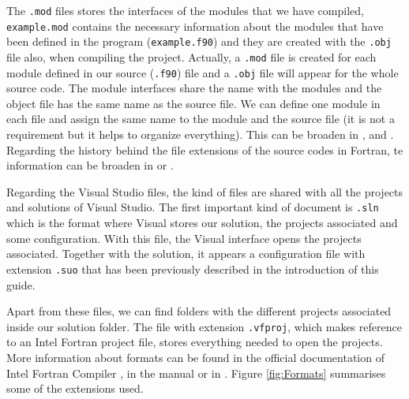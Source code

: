 \begin{enumerate}
    The \texttt{.mod} files stores the interfaces of the modules that we have compiled, \texttt{example.mod} contains the necessary information about the modules that have been defined in the program (\texttt{example.f90}) and they are created with the \texttt{.obj} file also, when compiling the project. Actually, a \texttt{.mod} file is created for each module defined in our source (\texttt{.f90}) file and a \texttt{.obj} file will appear for the whole source code. The module interfaces share the name with the modules and the object file has the same name as the source file. We can define one module in each file and assign the same name to the module and the source file (it is not a requirement but it helps to organize everything). This can be broaden in \citep{mod1}, \citet{mod2} and \citep{mod3}. Regarding the history behind the file extensions of the source codes in Fortran, te information can be broaden in \citet{f90} or \citet{f902}.
	    
	Regarding the Visual Studio files, the kind of files are shared with all the projects and solutions of Visual Studio. The first important kind of document is \texttt{.sln} which is the format where Visual stores our solution, the projects associated and some configuration. With this file, the Visual interface opens the projects associated. Together with the solution, it appears a configuration file with extension \texttt{.suo} that has been previously described in the introduction of this guide.  
    
    Apart from these files, we can find folders with the different projects associated inside our solution folder. The file with extension \texttt{.vfproj}, which makes reference to an Intel Fortran project file, stores everything needed to open the projects. More information about formats can be found in the official documentation of Intel Fortran Compiler \citep{format}, in the manual \citep{manual} or in \citep{format2}. Figure \ref{fig:Formats} summarises some of the extensions used.
    

\end{enumerate}

